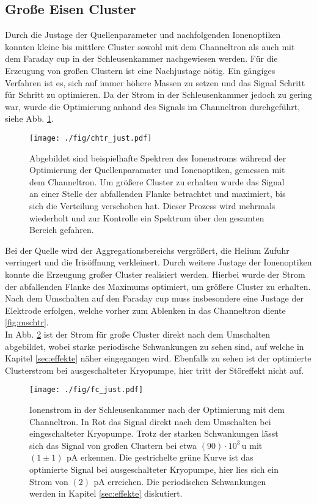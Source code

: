 \subsection{Große Eisen Cluster}
\label{sec:grossecluster}
Durch die Justage der Quellenparameter und nachfolgenden Ionenoptiken konnten kleine bis mittlere Cluster sowohl mit dem Channeltron als auch mit dem Faraday cup in der Schleusenkammer nachgewiesen werden.
Für die Erzeugung von großen Clustern ist eine Nachjustage nötig.
Ein gängiges Verfahren ist es, sich auf immer höhere Massen zu setzen und das Signal Schritt für Schritt zu optimieren.
Da der Strom in der Schleusenkammer jedoch zu gering war, wurde die Optimierung anhand des Signals im Channeltron durchgeführt, siehe Abb. \ref{fig:chtr_just}.
\begin{figure}
  \centering
  \texttt{[image: ./fig/chtr\_just.pdf]}
  \caption{Abgebildet sind beispielhafte Spektren des Ionenstroms während der Optimierung der Quellenparamater und Ionenoptiken, gemessen mit dem Channeltron. Um größere Cluster zu erhalten wurde das Signal an einer Stelle der abfallenden Flanke betrachtet und maximiert, bis sich die Verteilung verschoben hat. Dieser Prozess wird mehrmals wiederholt und zur Kontrolle ein Spektrum über den gesamten Bereich gefahren.}
  \label{fig:chtr_just}
\end{figure}
Bei der Quelle wird der Aggregationsbereichs vergrößert, die Helium Zufuhr verringert und
die Irisöffnung verkleinert.
Durch weitere Justage der Ionenoptiken konnte die Erzeugung großer Cluster realisiert werden.
Hierbei wurde der Strom der abfallenden Flanke des Maximums optimiert, um größere Cluster zu erhalten.
Nach dem Umschalten auf den Faraday cup muss insbesondere eine Justage der Elektrode erfolgen, welche vorher zum Ablenken in das Channeltron diente \ref{fig:mschtr}.\\
In Abb. \ref{fig:fc_just} ist der Strom für große Cluster direkt nach dem Umschalten abgebildet, wobei starke periodische Schwankungen zu sehen sind, auf welche in Kapitel \ref{sec:effekte} näher eingegangen wird.
Ebenfalls zu sehen ist der optimierte Clusterstrom bei ausgeschalteter Kryopumpe, hier tritt der Störeffekt nicht auf.
\begin{figure}
  \centering
  \texttt{[image: ./fig/fc\_just.pdf]}
  \caption{Ionenstrom in der Schleusenkammer nach der Optimierung mit dem Channeltron. In Rot das Signal direkt nach dem Umschalten bei eingeschalteter Kryopumpe. Trotz der starken Schwankungen lässt sich das Signal von großen Clustern bei etwa $(90)\cdot 10^3\,\text{u}$ mit $(1\pm 1)\,\SI{}{\pA}$ erkennen. Die gestrichelte grüne Kurve ist das optimierte Signal bei ausgeschalteter Kryopumpe, hier lies sich ein Strom von $(2)\,\SI{}{\pA}$ erreichen. Die periodischen Schwankungen werden in Kapitel \ref{sec:effekte} diskutiert.}
  \label{fig:fc_just}
\end{figure}
\clearpage
